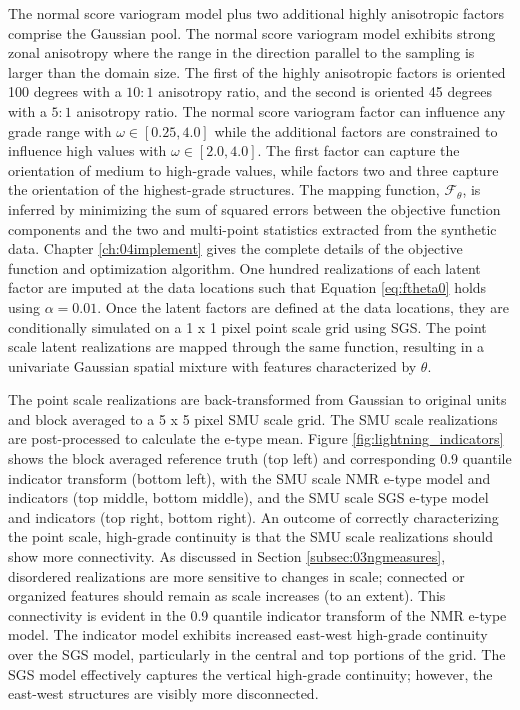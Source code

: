 The normal score variogram model plus two additional highly anisotropic factors comprise the Gaussian pool. The normal score variogram model exhibits strong zonal anisotropy where the range in the direction parallel to the sampling is larger than the domain size. The first of the highly anisotropic factors is oriented 100 degrees with a $10:1$ anisotropy ratio, and the second is oriented 45 degrees with a  $5:1$ anisotropy ratio. The normal score variogram factor can influence any grade range with $\omega \in [0.25, 4.0]$ while the additional factors are constrained to influence high values with $\omega \in [2.0, 4.0]$. The first factor can capture the orientation of medium to high-grade values, while factors two and three capture the orientation of the highest-grade structures. The mapping function, $\mathcal{F}_{\theta}$, is inferred by minimizing the sum of squared errors between the objective function components and the two and multi-point statistics extracted from the synthetic data. Chapter \ref{ch:04implement} gives the complete details of the objective function and optimization algorithm. One hundred realizations of each latent factor are imputed at the data locations such that Equation \ref{eq:ftheta0} holds using $\alpha = 0.01$. Once the latent factors are defined at the data locations, they are conditionally simulated on a 1 x 1 pixel point scale grid using \gls{SGS}. The point scale latent realizations are mapped through the same function, resulting in a univariate Gaussian spatial mixture with features characterized by $\theta$.

The point scale realizations are back-transformed from Gaussian to original units and block averaged to a 5 x 5 pixel \gls{SMU} scale grid. The \gls{SMU} scale realizations are post-processed to calculate the e-type mean. Figure \ref{fig:lightning_indicators} shows the block averaged reference truth (top left) and corresponding 0.9 quantile indicator transform (bottom left), with the \gls{SMU} scale \gls{NMR} e-type model and indicators (top middle, bottom middle), and the \gls{SMU} scale \gls{SGS} e-type model and indicators (top right, bottom right). An outcome of correctly characterizing the point scale, high-grade continuity is that the \gls{SMU} scale realizations should show more connectivity. As discussed in Section \ref{subsec:03ngmeasures}, disordered realizations are more sensitive to changes in scale; connected or organized features should remain as scale increases (to an extent). This connectivity is evident in the 0.9 quantile indicator transform of the \gls{NMR} e-type model. The indicator model exhibits increased east-west high-grade continuity over the \gls{SGS} model, particularly in the central and top portions of the grid. The \gls{SGS} model effectively captures the vertical high-grade continuity; however, the east-west structures are visibly more disconnected.

